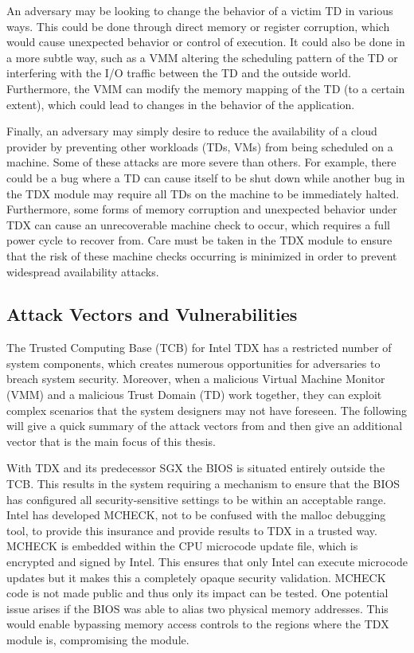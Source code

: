 
An adversary may be looking to change the behavior of a victim TD in various ways. This could be done through direct memory or register corruption, which would cause unexpected behavior or control of execution. It could also be done in a more subtle way, such as a VMM altering the scheduling pattern of the TD or interfering with the I/O traffic between the TD and the outside world. Furthermore, the VMM can modify the memory mapping of the TD (to a certain extent), which could lead to changes in the behavior of the application.


Finally, an adversary may simply desire to reduce the availability of a cloud provider by preventing other workloads (TDs, VMs) from being scheduled on a machine. Some of these attacks are more severe than others. For example, there could be a bug where a TD can cause itself to be shut down while another bug in the TDX module may require all TDs on the machine to be immediately halted. Furthermore, some forms of memory corruption and unexpected behavior under TDX can cause an unrecoverable machine check to occur, which requires a full power cycle to recover from. Care must be taken in the TDX module to ensure that the risk of these machine checks occurring is minimized in order to prevent widespread availability attacks.

\subsection{Attack Vectors and Vulnerabilities}

The Trusted Computing Base (TCB) for Intel TDX has a restricted number of system components, which creates numerous opportunities for adversaries to breach system security. Moreover, when a malicious Virtual Machine Monitor (VMM) and a malicious Trust Domain (TD) work together, they can exploit complex scenarios that the system designers may not have foreseen. The following will give a quick summary of the attack vectors from \cite{aktas_intel_nodate} and then give an additional vector that is the main focus of this thesis.

With TDX and its predecessor SGX the BIOS is situated entirely outside the TCB. This results in the system requiring a mechanism to ensure that the BIOS has configured all security-sensitive settings to be within an acceptable range. Intel has developed MCHECK, not to be confused with the malloc debugging tool, to provide this insurance and provide results to TDX in a trusted way. MCHECK is embedded within the CPU microcode update file, which is encrypted and signed by Intel. This ensures that only Intel can execute microcode updates but it makes this a completely opaque security validation. MCHECK code is not made public and thus only its impact can be tested. One potential issue arises if the BIOS was able to alias two physical memory addresses. This would enable bypassing memory access controls to the regions where the TDX module is, compromising the module. 

